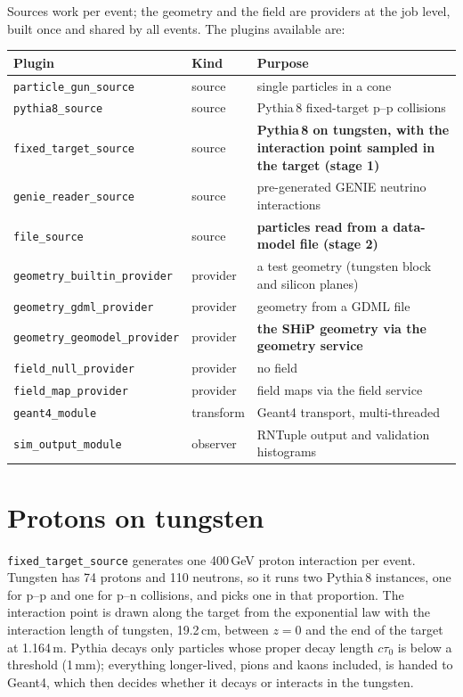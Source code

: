 Sources work per event; the geometry and the field are providers at the job
level, built once and shared by all events. The plugins available are:

\begin{center}
\small
\begin{tabularx}{\linewidth}{l l L}
\toprule
Plugin & Kind & Purpose \\
\midrule
\texttt{particle\_gun\_source}       & source   & single particles in a cone \\
\texttt{pythia8\_source}             & source   & Pythia\,8 fixed-target p--p collisions \\
\texttt{fixed\_target\_source}       & source   & \textbf{Pythia\,8 on tungsten, with the interaction point sampled in the target (stage 1)} \\
\texttt{genie\_reader\_source}       & source   & pre-generated GENIE neutrino interactions \\
\texttt{file\_source}                & source   & \textbf{particles read from a data-model file (stage 2)} \\
\texttt{geometry\_builtin\_provider} & provider & a test geometry (tungsten block and silicon planes) \\
\texttt{geometry\_gdml\_provider}    & provider & geometry from a GDML file \\
\texttt{geometry\_geomodel\_provider}& provider & \textbf{the SHiP geometry via the geometry service} \\
\texttt{field\_null\_provider}       & provider & no field \\
\texttt{field\_map\_provider}        & provider & field maps via the field service \\
\texttt{geant4\_module}              & transform& Geant4 transport, multi-threaded \\
\texttt{sim\_output\_module}         & observer & RNTuple output and validation histograms \\
\bottomrule
\end{tabularx}
\end{center}

\section{Protons on tungsten}

\texttt{fixed\_target\_source} generates one 400\,GeV proton interaction per
event. Tungsten has 74 protons and 110 neutrons, so it runs two Pythia\,8
instances, one for p--p and one for p--n collisions, and picks one in that
proportion. The interaction point is drawn along the target from the
exponential law with the interaction length of tungsten, 19.2\,cm, between
$z=0$ and the end of the target at 1.164\,m. Pythia decays only particles
whose proper decay length $c\tau_0$ is below a threshold (1\,mm); everything
longer-lived, pions and kaons included, is handed to Geant4, which then
decides whether it decays or interacts in the tungsten.

